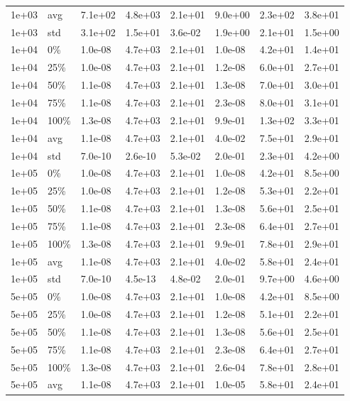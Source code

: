 \documentclass[11pt]{article}
\begin{document}
{\begin{longtable}{llllllll}
  1e+03 & avg & 7.1e+02 & 4.8e+03 & 2.1e+01 & 9.0e+00 & 2.3e+02 & 3.8e+01 \\ 
  1e+03 & std & 3.1e+02 & 1.5e+01 & 3.6e-02 & 1.9e+00 & 2.1e+01 & 1.5e+00 \\ 
  1e+04 & 0\% & 1.0e-08 & 4.7e+03 & 2.1e+01 & 1.0e-08 & 4.2e+01 & 1.4e+01 \\ 
  1e+04 & 25\% & 1.0e-08 & 4.7e+03 & 2.1e+01 & 1.2e-08 & 6.0e+01 & 2.7e+01 \\ 
  1e+04 & 50\% & 1.1e-08 & 4.7e+03 & 2.1e+01 & 1.3e-08 & 7.0e+01 & 3.0e+01 \\ 
  1e+04 & 75\% & 1.1e-08 & 4.7e+03 & 2.1e+01 & 2.3e-08 & 8.0e+01 & 3.1e+01 \\ 
  1e+04 & 100\% & 1.3e-08 & 4.7e+03 & 2.1e+01 & 9.9e-01 & 1.3e+02 & 3.3e+01 \\ 
  1e+04 & avg & 1.1e-08 & 4.7e+03 & 2.1e+01 & 4.0e-02 & 7.5e+01 & 2.9e+01 \\ 
  1e+04 & std & 7.0e-10 & 2.6e-10 & 5.3e-02 & 2.0e-01 & 2.3e+01 & 4.2e+00 \\ 
  1e+05 & 0\% & 1.0e-08 & 4.7e+03 & 2.1e+01 & 1.0e-08 & 4.2e+01 & 8.5e+00 \\ 
  1e+05 & 25\% & 1.0e-08 & 4.7e+03 & 2.1e+01 & 1.2e-08 & 5.3e+01 & 2.2e+01 \\ 
  1e+05 & 50\% & 1.1e-08 & 4.7e+03 & 2.1e+01 & 1.3e-08 & 5.6e+01 & 2.5e+01 \\ 
  1e+05 & 75\% & 1.1e-08 & 4.7e+03 & 2.1e+01 & 2.3e-08 & 6.4e+01 & 2.7e+01 \\ 
  1e+05 & 100\% & 1.3e-08 & 4.7e+03 & 2.1e+01 & 9.9e-01 & 7.8e+01 & 2.9e+01 \\ 
  1e+05 & avg & 1.1e-08 & 4.7e+03 & 2.1e+01 & 4.0e-02 & 5.8e+01 & 2.4e+01 \\ 
  1e+05 & std & 7.0e-10 & 4.5e-13 & 4.8e-02 & 2.0e-01 & 9.7e+00 & 4.6e+00 \\ 
  5e+05 & 0\% & 1.0e-08 & 4.7e+03 & 2.1e+01 & 1.0e-08 & 4.2e+01 & 8.5e+00 \\ 
  5e+05 & 25\% & 1.0e-08 & 4.7e+03 & 2.1e+01 & 1.2e-08 & 5.1e+01 & 2.2e+01 \\ 
  5e+05 & 50\% & 1.1e-08 & 4.7e+03 & 2.1e+01 & 1.3e-08 & 5.6e+01 & 2.5e+01 \\ 
  5e+05 & 75\% & 1.1e-08 & 4.7e+03 & 2.1e+01 & 2.3e-08 & 6.4e+01 & 2.7e+01 \\ 
  5e+05 & 100\% & 1.3e-08 & 4.7e+03 & 2.1e+01 & 2.6e-04 & 7.8e+01 & 2.8e+01 \\ 
  5e+05 & avg & 1.1e-08 & 4.7e+03 & 2.1e+01 & 1.0e-05 & 5.8e+01 & 2.4e+01 \\ 

\end{longtable}}
\end{document}
